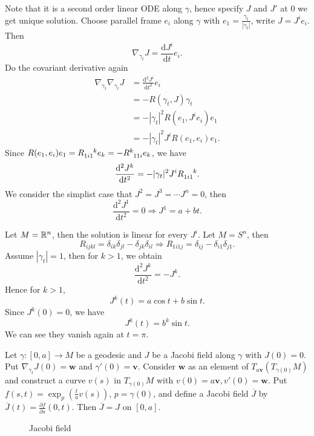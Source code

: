 Note that it is a second order linear ODE along $\gamma$, hence specify $J$ and $J'$ at $0$ we get unique solution. Choose parallel frame $e_i$ along $\gamma$ with $e_1= \frac{\gamma_t}{|\gamma_t|}$, write $J=J^ie_i$. Then 
\[
\nabla _{\gamma_t}J=\frac{\mathrm{d}J^i}{\mathrm{d}t}e_i.
\] 
Do the covariant derivative again
\begin{align*}
  \nabla _{\gamma_t}\nabla _{\gamma_t}J&= \frac{\mathrm{d}^2 J^i}{\mathrm{d}t^2}e_i\\
  &=-R\left( \gamma_t,J \right) \gamma_t\\
  &=-|\gamma_t|^2R\left( e_1,J^ie_i \right) e_1\\
  &=-|\gamma_t|^2 J^i R\left( e_1,e_i \right) e_1
.\end{align*}
Since $R(e_1,e_i)e_1=\tensor[]{R}{_1_i_1^k}e_k=-\tensor[]{R}{^k_1_1_i}e_k $, we have
\begin{equation}
  \frac{\mathrm{d}^2J^k}{\mathrm{d}t^2}=-|\gamma_t|^2J^i \tensor[]{R}{_1_i_1^k}. 
\end{equation}
We consider the simplist case that $J^2=J^3=\cdots J^n=0$, then 
\[
\frac{\mathrm{d}^2J^1}{\mathrm{d}t^2}=0\Rightarrow J^1=a+bt.
\] 
\begin{example}
  Let $M=\mathbb{R}^{n}$, then the solution is linear for every $J^i$. Let $M=S^n$, then 
  \[
  R_{ijkl}=\delta_{ik}\delta_{jl}-\delta_{jk}\delta_{il}\Rightarrow R_{1i1j}=\delta_{ij}-\delta_{i1}\delta_{j 1}.
  \] 
  Assume $|\gamma_t|=1$, then for $k>1$, we obtain
   \[
  \frac{\mathrm{d}^2J^k}{\mathrm{d}t^2}=-J^k.
  \]
  Hence for  $k>1$, 
  \[
    J^k(t)=a\cos t+b \sin t.
  \] 
  Since $J^k(0)=0$, we have 
  \[
    J^k(t)=b^k \sin t.
  \] 
  We can see they vanish again at $t=\pi$.
\end{example}
\begin{proposition}
Let $\gamma:[0,a]\to M$ be a geodesic and $J$ be a Jacobi field along $\gamma$ with $J(0)=0$. Put $\nabla _{\gamma_t}J(0)=\mathbf{w}$ and $\gamma'(0)=\mathbf{v}$. Consider $\mathbf{w}$ as an element of $T_{a\mathbf{v}}\left( T_{\gamma(0)}M \right) $ and construct a curve $v(s)$ in $T_{\gamma(0)}M$ with $v(0)=a\mathbf{v},v'(0)=\mathbf{w}$. Put $f(s,t)=\exp_p\left(  \frac{t}{a}v(s) \right) $, $p=\gamma(0)$, and define a Jacobi field $\overline{J}$ by $\overline{J}(t)= \frac{\partial f}{\partial s} (0,t)$. Then $\overline{J}=J$ on $[0,a]$.
\end{proposition}

\begin{figure}[ht]
    \centering
    \caption{Jacobi field}
    \label{fig:jacobi-field}
\end{figure}

